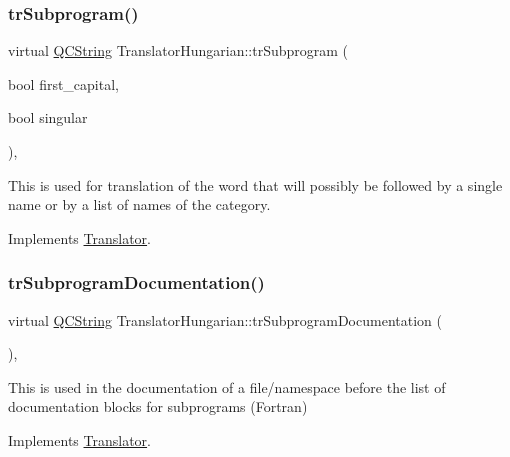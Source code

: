 \mbox{\label{class_translator_hungarian_a422d82da8275d8bbb7d33d81529b0429}} 
\subsubsection{\texorpdfstring{trSubprogram()}{trSubprogram()}}
{\footnotesize\ttfamily virtual \mbox{\hyperlink{class_q_c_string}{Q\+C\+String}} Translator\+Hungarian\+::tr\+Subprogram (\begin{DoxyParamCaption}\item[{bool}]{first\+\_\+capital,  }\item[{bool}]{singular }\end{DoxyParamCaption})\hspace{0.3cm}{\ttfamily [inline]}, {\ttfamily [virtual]}}

This is used for translation of the word that will possibly be followed by a single name or by a list of names of the category. 

Implements \mbox{\hyperlink{class_translator}{Translator}}.

\mbox{\label{class_translator_hungarian_a86093c7631319677567785432600c114}} 
\subsubsection{\texorpdfstring{trSubprogramDocumentation()}{trSubprogramDocumentation()}}
{\footnotesize\ttfamily virtual \mbox{\hyperlink{class_q_c_string}{Q\+C\+String}} Translator\+Hungarian\+::tr\+Subprogram\+Documentation (\begin{DoxyParamCaption}{ }\end{DoxyParamCaption})\hspace{0.3cm}{\ttfamily [inline]}, {\ttfamily [virtual]}}

This is used in the documentation of a file/namespace before the list of documentation blocks for subprograms (Fortran) 

Implements \mbox{\hyperlink{class_translator}{Translator}}.

